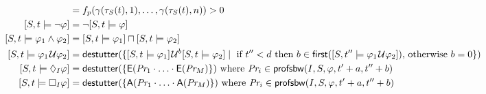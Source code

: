\scriptsize
\begin{align*}
	[S,t \models p] &=  f_p(\gamma(\tau_S(t), 1), \ldots, \gamma(\tau_S(t), n)) > 0 \\
	[S,t \models \lnot \varphi] &= \lnot [S,t \models \varphi] \\
	[S,t \models \varphi_1 \land \varphi_2] &= [S,t \models \varphi_1] \sqcap [S,t \models \varphi_2] \\
	[S,t \models \varphi_1 \until \varphi_2] &= \destutter(\{ [S,t \models \varphi_1] \until^b [S,t \models \varphi_2] \st \text{ if $t'' < d$ then $b \in \first([S,t'' \models \varphi_1 \until \varphi_2])$, otherwise $b = 0$} \}) \\
	[S,t \models \LTLf_I \varphi] &= \destutter(\{ \mathsf{E}(\textit{Pr}_1 \cdot \ldots \cdot \mathsf{E}(\textit{Pr}_M) \}) \text{ where $\textit{Pr}_i \in \mathsf{profsbw}(I, S, \varphi, t' + a, t'' + b)$} \\
	[S,t \models \LTLg_I \varphi] &= \destutter(\{ \mathsf{A}(\textit{Pr}_1 \cdot \ldots \cdot \mathsf{A}(\textit{Pr}_M) \}) \text{ where $\textit{Pr}_i \in \mathsf{profsbw}(I, S, \varphi, t' + a, t'' + b)$}
\end{align*}
\normalsize




